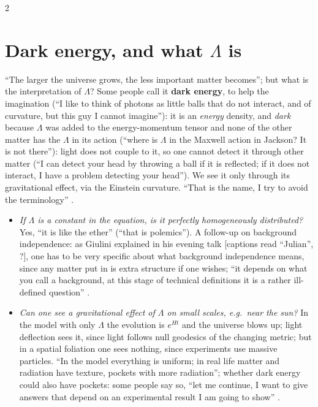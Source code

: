 \begin{paracol}{2}
\section{Dark energy, and what $\Lambda$ is}\label{sec:c21-dark}

``The larger the universe grows, the less important matter becomes''; but what is the interpretation of $\Lambda$? Some people call it \textbf{dark energy}, to help the imagination (``I like to think of photons as little balls that do not interact, and of curvature, but this guy I cannot imagine''): it is an \emph{energy} density, and \emph{dark} because $\Lambda$ was added to the energy-momentum tensor and none of the other matter has the $\Lambda$ in its action (``where is $\Lambda$ in the Maxwell action in Jackson? It is not there''): light does not couple to it, so one cannot detect it through other matter (``I can detect your head by throwing a ball if it is reflected; if it does not interact, I have a problem detecting your head''). We see it only through its gravitational effect, via the Einstein curvature. ``That is the name, I try to avoid the terminology'' .

\begin{coursenote}
\begin{itemize}
  \item \emph{If $\Lambda$ is a constant in the equation, is it perfectly homogeneously distributed?} Yes, ``it is like the ether'' (``that is polemics''). A follow-up on background independence: as Giulini explained in his evening talk [captions read ``Julian'', ?], one has to be very specific about what background independence means, since any matter put in is extra structure if one wishes; ``it depends on what you call a background, at this stage of technical definitions it is a rather ill-defined question'' .
  \item \emph{Can one see a gravitational effect of $\Lambda$ on small scales, e.g.\ near the sun?} In the model with only $\Lambda$ the evolution is $e^{Ht}$ and the universe blows up; light deflection sees it, since light follows null geodesics of the changing metric; but in a spatial foliation one sees nothing, since experiments use massive particles. ``In the model everything is uniform; in real life matter and radiation have texture, pockets with more radiation''; whether dark energy could also have pockets: some people say so, ``let me continue, I want to give answers that depend on an experimental result I am going to show'' .
\end{itemize}
\end{coursenote}


\end{paracol}
